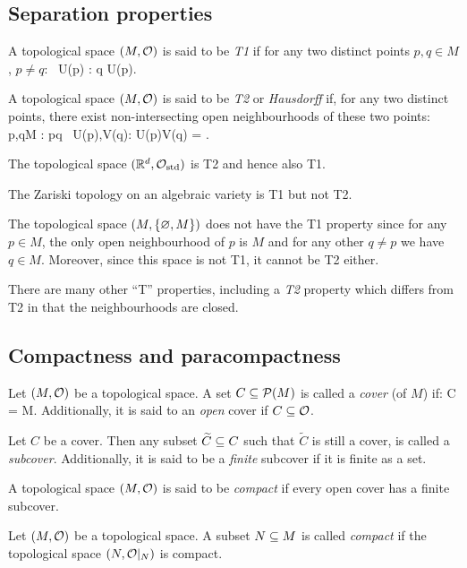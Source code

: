 \subsection{Separation properties}

\bd
A topological space $(M,\mathcal{O})$ is said to be \emph{T1} if for any two distinct points $p,q\in M$, $p\neq q$:
\bse
\exists \, U(p) \in \cO : q \notin U(p).
\ese
\ed

\bd
A topological space $(M,\mathcal{O})$ is said to be \emph{T2} or \emph{Hausdorff} if, for any two distinct points, there exist non-intersecting open neighbourhoods of these two points:
\bse
\forall \, p,q\in M : p\neq q \imp \exists \, U(p),V(q)\in \cO : U(p)\cap V(q) = \vn.
\ese
\ed

\be
The topological space $(\mathbb{R}^d,\mathcal{O}_\mathrm{std})$ is T2 and hence also T1.
\ee

\be
The Zariski topology on an algebraic variety is T1 but not T2.
\ee

\be
The topological space $(M,\{\varnothing,M\})$ does not have the T1 property since for any $p \in M$, the only open neighbourhood of $p$ is $M$ and for any other $q\neq p$ we have $q\in M$. Moreover, since this space is not T1, it cannot be T2 either.
\ee

\br
There are many other ``T'' properties, including a \emph{T2} property which differs from T2 in that the neighbourhoods are closed.
\er

\subsection{Compactness and paracompactness}

\bd
Let $(M,\mathcal{O})$ be a topological space. A set $C \subseteq \mathcal{P}(M)$ is called a \emph{cover} (of $M$) if:
\bse
\bigcup C = M.
\ese
Additionally, it is said to an \emph{open} cover if $C \subseteq \mathcal{O}$.
\ed

\bd
Let $C$ be a cover. Then any subset $\widetilde{C}\subseteq C$ such that $\widetilde{C}$ is still a cover, is called a \emph{subcover}. Additionally, it is said to be a \emph{finite} subcover if it is finite as a set.
\ed

\bd
A topological space $(M,\mathcal{O})$ is said to be \emph{compact} if every open cover has a finite subcover.
\ed

\bd
Let $(M,\mathcal{O})$ be a topological space. A subset $N\subseteq M$ is called \emph{compact} if the topological space $(N,\mathcal{O}|_N)$ is compact.
\ed

